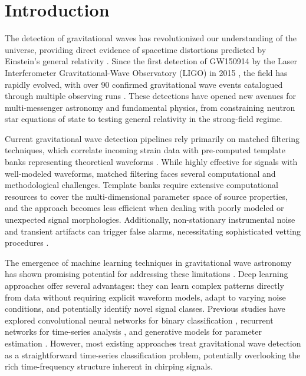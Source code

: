 \documentclass{iopjournal}
\begin{document}
\section{Introduction}

The detection of gravitational waves has revolutionized our understanding of the universe, providing direct evidence of spacetime distortions predicted by Einstein's general relativity \cite{einstein1916}. Since the first detection of GW150914 by the Laser Interferometer Gravitational-Wave Observatory (LIGO) in 2015 \cite{abbott2016observation}, the field has rapidly evolved, with over 90 confirmed gravitational wave events catalogued through multiple observing runs \cite{abbott2021gwtc3}. These detections have opened new avenues for multi-messenger astronomy and fundamental physics, from constraining neutron star equations of state to testing general relativity in the strong-field regime.

Current gravitational wave detection pipelines rely primarily on matched filtering techniques, which correlate incoming strain data with pre-computed template banks representing theoretical waveforms \cite{usman2016pycbc, messick2017analysis}. While highly effective for signals with well-modeled waveforms, matched filtering faces several computational and methodological challenges. Template banks require extensive computational resources to cover the multi-dimensional parameter space of source properties, and the approach becomes less efficient when dealing with poorly modeled or unexpected signal morphologies. Additionally, non-stationary instrumental noise and transient artifacts can trigger false alarms, necessitating sophisticated vetting procedures \cite{cain2017methods}.

The emergence of machine learning techniques in gravitational wave astronomy has shown promising potential for addressing these limitations \cite{george2018deep, gabbard2018matching}. Deep learning approaches offer several advantages: they can learn complex patterns directly from data without requiring explicit waveform models, adapt to varying noise conditions, and potentially identify novel signal classes. Previous studies have explored convolutional neural networks for binary classification \cite{george2018deep}, recurrent networks for time-series analysis \cite{schafer2020training}, and generative models for parameter estimation \cite{green2020gravitational}. However, most existing approaches treat gravitational wave detection as a straightforward time-series classification problem, potentially overlooking the rich time-frequency structure inherent in chirping signals.
\end{document}
